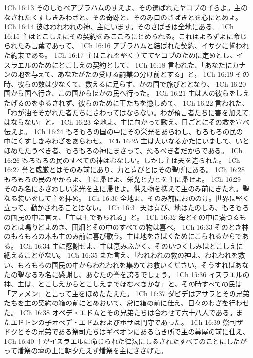1Ch 16:13  そのしもべアブラハムのすえよ、その選ばれたヤコブの子らよ。主のなされたくすしきみわざと、その奇跡と、そのみ口のさばきとを心にとめよ。
1Ch 16:14  彼はわれわれの神、主にいます。そのさばきは全地にある。
1Ch 16:15  主はとこしえにその契約をみこころにとめられる。これはよろずよに命じられたみ言葉であって、
1Ch 16:16  アブラハムと結ばれた契約、イサクに誓われた約束である。
1Ch 16:17  主はこれを堅く立ててヤコブのために定めとし、イスラエルのためにとこしえの契約として、
1Ch 16:18  言われた、「あなたにカナンの地を与えて、あなたがたの受ける嗣業の分け前とする」と。
1Ch 16:19  その時、彼らの数は少なくて、数えるに足らず、かの国で旅びととなり、
1Ch 16:20  国から国へ行き、この国からほかの民へ行った。
1Ch 16:21  主は人の彼らをしえたげるのをゆるされず、彼らのために王たちを懲しめて、
1Ch 16:22  言われた、「わが油そそがれた者たちにさわってはならない。わが預言者たちに害を加えてはならない」と。
1Ch 16:23  全地よ、主に向かって歌え。日ごとにその救を宣べ伝えよ。
1Ch 16:24  もろもろの国の中にその栄光をあらわし、もろもろの民の中にくすしきみわざをあらわせ。
1Ch 16:25  主は大いなるかたにいまして、いとほめたたうべき者、もろもろの神にまさって、恐るべき者だからである。
1Ch 16:26  もろもろの民のすべての神はむなしい。しかし主は天を造られた。
1Ch 16:27  誉と威厳とはそのみ前にあり、力と喜びとはその聖所にある。
1Ch 16:28  もろもろの民のやからよ、主に帰せよ、栄光と力とを主に帰せよ。
1Ch 16:29  そのみ名にふさわしい栄光を主に帰せよ。供え物を携えて主のみ前にきたれ。聖なる装いをして主を拝め。
1Ch 16:30  全地よ、そのみ前におののけ。世界は堅く立って、動かされることはない。
1Ch 16:31  天は喜び、地はたのしみ、もろもろの国民の中に言え、「主は王であられる」と。
1Ch 16:32  海とその中に満つるものとは鳴りどよめき、田畑とその中のすべての物は喜べ。
1Ch 16:33  そのとき林のもろもろの木も主のみ前に喜び歌う。主は地をさばくためにこられるからである。
1Ch 16:34  主に感謝せよ、主は恵みふかく、そのいつくしみはとこしえに絶えることがない。
1Ch 16:35  また言え、「われわれの救の神よ、われわれを救い、もろもろの国民の中からわれわれを集めてお救いください。そうすればあなたの聖なるみ名に感謝し、あなたの誉を誇るでしょう。
1Ch 16:36  イスラエルの神、主は、とこしえからとこしえまでほむべきかな」と。その時すべての民は「アァメン」と言って主をほめたたえた。
1Ch 16:37  ダビデはアサフとその兄弟たちを主の契約の箱の前にとめおいて、常に箱の前に仕え、日々のわざを行わせた。
1Ch 16:38  オベデ・エドムとその兄弟たちは合わせて六十八人である。またエドトンの子オベデ・エドムおよびホサは門守であった。
1Ch 16:39  祭司ザドクとその兄弟である祭司たちはギベオンにある高き所で主の幕屋の前に仕え、
1Ch 16:40  主がイスラエルに命じられた律法にしるされたすべてのことにしたがって燔祭の壇の上に朝夕たえず燔祭を主にささげた。
